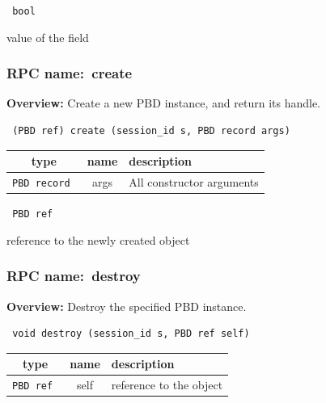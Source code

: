 \vspace{0.3cm}

{\tt 
bool
}


value of the field
\vspace{0.3cm}
\vspace{0.3cm}
\vspace{0.3cm}
\subsubsection{RPC name:~create}

{\bf Overview:} 
Create a new PBD instance, and return its handle.

\begin{verbatim} (PBD ref) create (session_id s, PBD record args)\end{verbatim}



 
\vspace{0.3cm}
\begin{tabular}{|c|c|p{7cm}|}
 \hline
{\bf type} & {\bf name} & {\bf description} \\ \hline
{\tt PBD record } & args & All constructor arguments \\ \hline 

\end{tabular}

\vspace{0.3cm}

{\tt 
PBD ref
}


reference to the newly created object
\vspace{0.3cm}
\vspace{0.3cm}
\vspace{0.3cm}
\subsubsection{RPC name:~destroy}

{\bf Overview:} 
Destroy the specified PBD instance.

\begin{verbatim} void destroy (session_id s, PBD ref self)\end{verbatim}



 
\vspace{0.3cm}
\begin{tabular}{|c|c|p{7cm}|}
 \hline
{\bf type} & {\bf name} & {\bf description} \\ \hline
{\tt PBD ref } & self & reference to the object \\ \hline 

\end{tabular}

